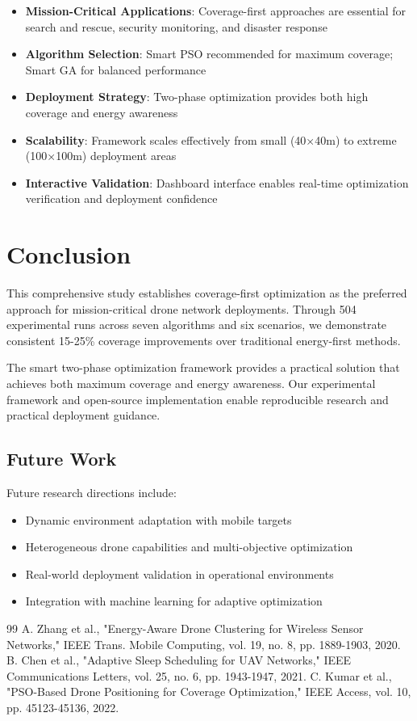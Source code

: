 \documentclass[conference]{IEEEtran}
\begin{document}
\begin{itemize}
\item \textbf{Mission-Critical Applications}: Coverage-first approaches are essential for search and rescue, security monitoring, and disaster response
\item \textbf{Algorithm Selection}: Smart PSO recommended for maximum coverage; Smart GA for balanced performance
\item \textbf{Deployment Strategy}: Two-phase optimization provides both high coverage and energy awareness
\item \textbf{Scalability}: Framework scales effectively from small (40×40m) to extreme (100×100m) deployment areas
\item \textbf{Interactive Validation}: Dashboard interface enables real-time optimization verification and deployment confidence
\end{itemize}

\section{Conclusion}

This comprehensive study establishes coverage-first optimization as the preferred approach for mission-critical drone network deployments. Through 504 experimental runs across seven algorithms and six scenarios, we demonstrate consistent 15-25\% coverage improvements over traditional energy-first methods.

The smart two-phase optimization framework provides a practical solution that achieves both maximum coverage and energy awareness. Our experimental framework and open-source implementation enable reproducible research and practical deployment guidance.

\subsection{Future Work}
Future research directions include:
\begin{itemize}
\item Dynamic environment adaptation with mobile targets
\item Heterogeneous drone capabilities and multi-objective optimization
\item Real-world deployment validation in operational environments
\item Integration with machine learning for adaptive optimization
\end{itemize}

\begin{thebibliography}{99}
 A. Zhang et al., "Energy-Aware Drone Clustering for Wireless Sensor Networks," IEEE Trans. Mobile Computing, vol. 19, no. 8, pp. 1889-1903, 2020.
 B. Chen et al., "Adaptive Sleep Scheduling for UAV Networks," IEEE Communications Letters, vol. 25, no. 6, pp. 1943-1947, 2021.
 C. Kumar et al., "PSO-Based Drone Positioning for Coverage Optimization," IEEE Access, vol. 10, pp. 45123-45136, 2022.
\end{thebibliography}
\end{document}
